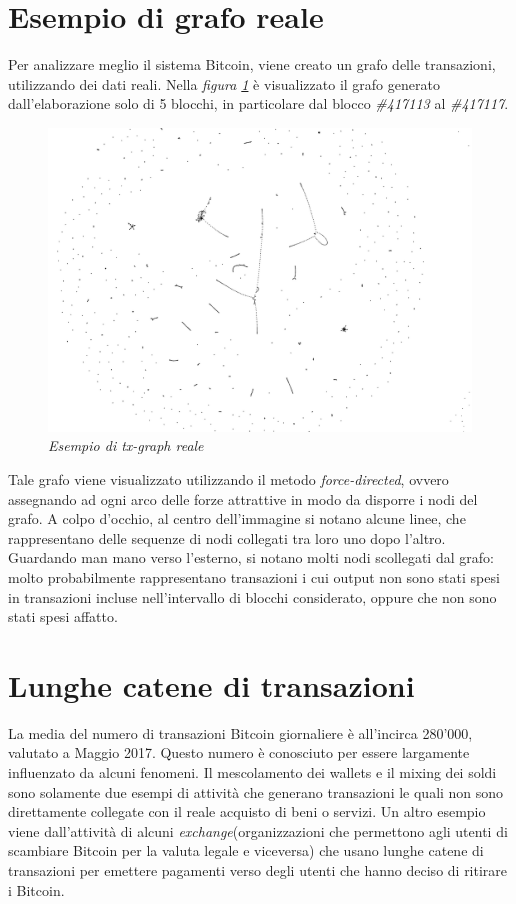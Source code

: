 \section{Esempio di grafo reale}
Per analizzare meglio il sistema Bitcoin, viene creato un grafo delle transazioni, utilizzando dei dati reali. Nella \textit{figura \ref{fig:txgraph}} è visualizzato il grafo generato dall'elaborazione solo di 5 blocchi, in particolare dal blocco \textit{\#417113} al \textit{\#417117}.

\begin{figure}[htbp]
	\centering
	\includegraphics[width =0.8 \linewidth]{figure/txgraph}
	\caption{\textit{Esempio di tx-graph reale}}\label{fig:txgraph}
\end{figure}

Tale grafo viene visualizzato utilizzando il metodo \textit{force-directed}, ovvero assegnando ad ogni arco delle forze attrattive in modo da disporre i nodi del grafo.
A colpo d'occhio, al centro dell'immagine si notano alcune linee, che rappresentano delle sequenze di nodi collegati tra loro uno dopo l'altro.
Guardando man mano verso l'esterno, si notano molti nodi scollegati dal grafo: molto probabilmente rappresentano transazioni i cui output non sono stati spesi in transazioni incluse nell'intervallo di blocchi considerato, oppure che non sono stati spesi affatto.

\section{Lunghe catene di transazioni}
La media del numero di transazioni Bitcoin giornaliere è all'incirca 280'000, valutato a Maggio 2017. Questo numero è conosciuto per essere largamente influenzato da alcuni fenomeni.
Il mescolamento dei wallets e il mixing dei soldi sono solamente due esempi di attività che generano transazioni le quali non sono direttamente collegate con il reale acquisto di beni o servizi. Un altro esempio viene dall'attività di alcuni \textit{exchange}(organizzazioni che permettono agli utenti di scambiare Bitcoin per la valuta legale e viceversa) che usano lunghe catene di transazioni per emettere pagamenti verso degli utenti che hanno deciso di ritirare i Bitcoin. 

